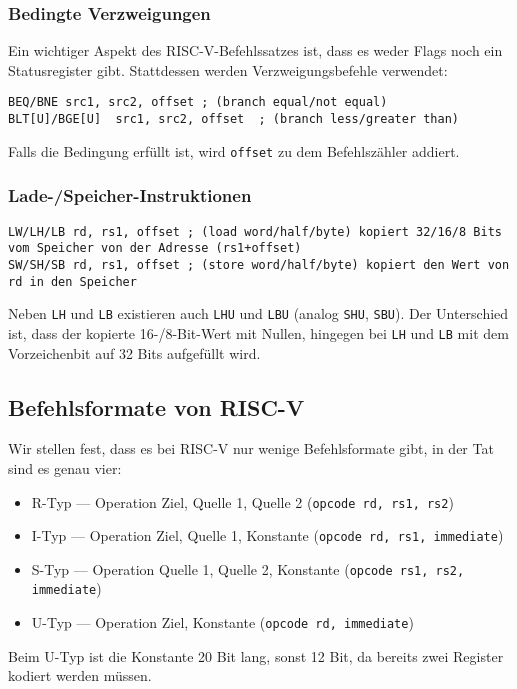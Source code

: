 \subsubsection{Bedingte Verzweigungen}

Ein wichtiger Aspekt des RISC-V-Befehlssatzes ist, dass es weder Flags noch ein Statusregister gibt. Stattdessen
werden Verzweigungsbefehle verwendet:

\begin{lstlisting}[style=risc-v_Assembler]
BEQ/BNE src1, src2, offset ; (branch equal/not equal)
BLT[U]/BGE[U]  src1, src2, offset  ; (branch less/greater than)
\end{lstlisting}

Falls die Bedingung erfüllt ist, wird \lstinline[style=risc-v_Assembler]!offset! zu dem Befehlszähler addiert.

\subsubsection{Lade-/Speicher-Instruktionen}

\begin{lstlisting}[style=risc-v_Assembler]
LW/LH/LB rd, rs1, offset ; (load word/half/byte) kopiert 32/16/8 Bits vom Speicher von der Adresse (rs1+offset)
SW/SH/SB rd, rs1, offset ; (store word/half/byte) kopiert den Wert von rd in den Speicher
\end{lstlisting}

Neben \lstinline[style=risc-v_Assembler]!LH! und \lstinline[style=risc-v_Assembler]!LB! existieren auch \lstinline[style=risc-v_Assembler]!LHU! und \lstinline[style=risc-v_Assembler]!LBU! (analog \lstinline[style=risc-v_Assembler]!SHU!, \lstinline[style=risc-v_Assembler]!SBU!). Der Unterschied ist, dass der
kopierte 16-/8-Bit-Wert mit Nullen, hingegen bei \lstinline[style=risc-v_Assembler]!LH! und \lstinline[style=risc-v_Assembler]!LB! mit dem Vorzeichenbit auf 32 Bits aufgefüllt wird.

\subsection{Befehlsformate von RISC-V}

Wir stellen fest, dass es bei RISC-V nur wenige Befehlsformate gibt, in der Tat sind es genau vier:

\begin{itemize}
\item R-Typ --- Operation Ziel, Quelle 1, Quelle 2 (\lstinline[style=risc-v_Assembler]!opcode rd, rs1, rs2!)
\item I-Typ --- Operation Ziel, Quelle 1, Konstante (\lstinline[style=risc-v_Assembler]!opcode rd, rs1, immediate!)
\item S-Typ --- Operation Quelle 1, Quelle 2, Konstante (\lstinline[style=risc-v_Assembler]!opcode rs1, rs2, immediate!)
\item U-Typ --- Operation Ziel, Konstante (\lstinline[style=risc-v_Assembler]!opcode rd, immediate!)
\end{itemize}

Beim U-Typ ist die Konstante 20 Bit lang, sonst 12 Bit, da bereits zwei Register kodiert werden müssen.
